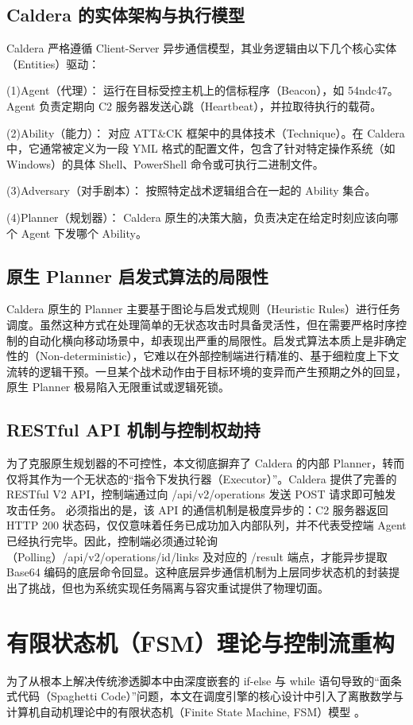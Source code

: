 \documentclass[twoside,openright]{xduugthesis}
\begin{document}
\subsection{ Caldera 的实体架构与执行模型}
Caldera 严格遵循 Client-Server 异步通信模型，其业务逻辑由以下几个核心实体（Entities）驱动：

(1)Agent（代理）： 运行在目标受控主机上的信标程序（Beacon），如 54ndc47。Agent 负责定期向 C2 服务器发送心跳（Heartbeat），并拉取待执行的载荷。

(2)Ability（能力）： 对应 ATT&CK 框架中的具体技术（Technique）。在 Caldera 中，它通常被定义为一段 YML 格式的配置文件，包含了针对特定操作系统（如 Windows）的具体 Shell、PowerShell 命令或可执行二进制文件。

(3)Adversary（对手剧本）： 按照特定战术逻辑组合在一起的 Ability 集合。

(4)Planner（规划器）： Caldera 原生的决策大脑，负责决定在给定时刻应该向哪个 Agent 下发哪个 Ability。

\subsection{ 原生 Planner 启发式算法的局限性}
Caldera 原生的 Planner 主要基于图论与启发式规则（Heuristic Rules）进行任务调度。虽然这种方式在处理简单的无状态攻击时具备灵活性，但在需要严格时序控制的自动化横向移动场景中，却表现出严重的局限性。启发式算法本质上是非确定性的（Non-deterministic），它难以在外部控制端进行精准的、基于细粒度上下文流转的逻辑干预。一旦某个战术动作由于目标环境的变异而产生预期之外的回显，原生 Planner 极易陷入无限重试或逻辑死锁。
\subsection{RESTful API 机制与控制权劫持}
为了克服原生规划器的不可控性，本文彻底摒弃了 Caldera 的内部 Planner，转而仅将其作为一个无状态的“指令下发执行器（Executor）”。Caldera 提供了完善的 RESTful V2 API，控制端通过向 /api/v2/operations 发送 POST 请求即可触发攻击任务。
必须指出的是，该 API 的通信机制是极度异步的：C2 服务器返回 HTTP 200 状态码，仅仅意味着任务已成功加入内部队列，并不代表受控端 Agent 已经执行完毕。因此，控制端必须通过轮询（Polling）/api/v2/operations/{id}/links 及对应的 /result 端点，才能异步提取 Base64 编码的底层命令回显。这种底层异步通信机制为上层同步状态机的封装提出了挑战，但也为系统实现任务隔离与容灾重试提供了物理切面。
\section{有限状态机（FSM）理论与控制流重构}
为了从根本上解决传统渗透脚本中由深度嵌套的 if-else 与 while 语句导致的“面条式代码（Spaghetti Code）”问题，本文在调度引擎的核心设计中引入了离散数学与计算机自动机理论中的有限状态机（Finite State Machine, FSM）模型 。
\end{document}
